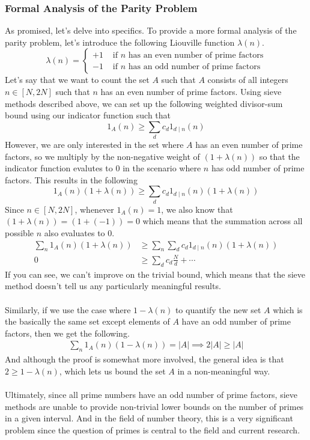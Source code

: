 \documentclass[10pt]{extarticle}
\begin{document}
\subsubsection{Formal Analysis of the Parity Problem}
As promised, let's delve into specifics. To provide a more formal analysis of the parity problem, let's introduce the following Liouville function $\lambda(n)$.
$$
\lambda(n) = \begin{cases}
  +1 & \text{ if } n \text{ has an even number of prime factors}\\
  -1 & \text{ if } n \text{ has an odd number of prime factors}
\end{cases}
$$
Let's say that we want to count the set $A$ such that $A$ consists of all integers $n \in [N,2N]$ such that $n$ has an even number of prime factors. Using sieve methods described above, we can set up the following weighted divisor-sum bound using our indicator function such that
$$
1_A(n) \geq \sum_{d} c_d 1_{d \mid n} (n)
$$
However, we are only interested in the set where $A$ has an even number of prime factors, so we multiply by the non-negative weight of $(1 + \lambda(n))$ so that the indicator function evalutes to $0$ in the scenario where $n$ has odd number of prime factors. This results in the following
$$
1_A(n) (1 + \lambda(n)) \geq \sum_{d} c_d 1_{d \mid n} (n) (1 + \lambda(n))
$$
Since $n \in [N,2N]$, whenever $1_A(n) = 1$, we also know that $(1 + \lambda(n)) = (1 + (-1)) = 0$ which means that the summation across all possible $n$ also evaluates to $0$.
\begin{align*}
  \sum_{n} 1_A(n) (1 + \lambda(n)) &\geq \sum_{n} \sum_{d} c_d 1_{d \mid n} (n) (1 + \lambda(n))\\
  0 &\geq \sum_{d} c_d \frac{N}{d} + \cdots
\end{align*}
If you can see, we can't improve on the trivial bound, which means that the sieve method doesn't tell us any particularly meaningful results.\\
\\
Similarly, if we use the case where $1 -\lambda(n)$ to quantify the new set $A$ which is the basically the same set except elements of $A$ have an odd number of prime factors, then we get the following.
\begin{align*}
  \sum_{n} 1_A(n) (1 - \lambda(n)) = |A| \implies 2|A| \geq |A|
\end{align*}
And although the proof is somewhat more involved, the general idea is that $2 \geq 1 - \lambda(n)$, which lets us bound the set $A$ in a non-meaningful way.\\
\\
Ultimately, since all prime numbers have an odd number of prime factors, sieve methods are unable to provide non-trivial lower bounds on the number of primes in a given interval. 
And in the field of number theory, this is a very significant problem since the question of primes is central to the field and current research.
\end{document}
